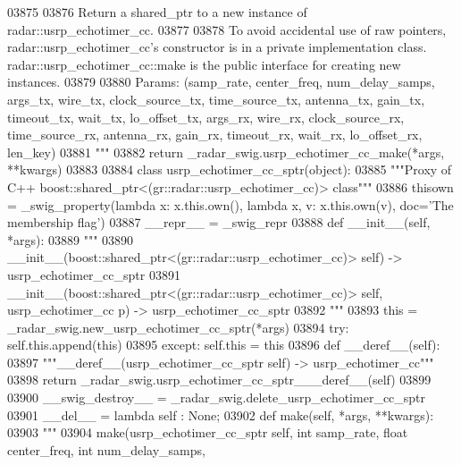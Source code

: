 \begin{DoxyCode}
{{{{{{{{{{{{{{03875 \textcolor{stringliteral}{}
03876 \textcolor{stringliteral}{    Return a shared\_ptr to a new instance of radar::usrp\_echotimer\_cc.}
03877 \textcolor{stringliteral}{}
03878 \textcolor{stringliteral}{    To avoid accidental use of raw pointers, radar::usrp\_echotimer\_cc's constructor is in a private
       implementation class. radar::usrp\_echotimer\_cc::make is the public interface for creating new instances.}
03879 \textcolor{stringliteral}{}
03880 \textcolor{stringliteral}{    Params: (samp\_rate, center\_freq, num\_delay\_samps, args\_tx, wire\_tx, clock\_source\_tx, time\_source\_tx,
       antenna\_tx, gain\_tx, timeout\_tx, wait\_tx, lo\_offset\_tx, args\_rx, wire\_rx, clock\_source\_rx, time\_source\_rx,
       antenna\_rx, gain\_rx, timeout\_rx, wait\_rx, lo\_offset\_rx, len\_key)}
03881 \textcolor{stringliteral}{    """}
03882   \textcolor{keywordflow}{return} \_radar\_swig.usrp\_echotimer\_cc\_make(*args, **kwargs)
03883 
03884 \textcolor{keyword}{class }usrp_echotimer_cc_sptr(object):
03885     \textcolor{stringliteral}{"""Proxy of C++ boost::shared\_ptr<(gr::radar::usrp\_echotimer\_cc)> class"""}
03886     thisown = _swig_property(\textcolor{keyword}{lambda} x: x.this.own(), \textcolor{keyword}{lambda} x, v: x.this.own(v), doc=\textcolor{stringliteral}{'The membership flag'})
03887     \_\_repr\_\_ = \_swig\_repr
03888     \textcolor{keyword}{def }__init__(self, *args): 
03889         \textcolor{stringliteral}{"""}
03890 \textcolor{stringliteral}{        \_\_init\_\_(boost::shared\_ptr<(gr::radar::usrp\_echotimer\_cc)> self) -> usrp\_echotimer\_cc\_sptr}
03891 \textcolor{stringliteral}{        \_\_init\_\_(boost::shared\_ptr<(gr::radar::usrp\_echotimer\_cc)> self, usrp\_echotimer\_cc p) ->
       usrp\_echotimer\_cc\_sptr}
03892 \textcolor{stringliteral}{        """}
03893         this = \_radar\_swig.new\_usrp\_echotimer\_cc\_sptr(*args)
03894         \textcolor{keywordflow}{try}: self.this.append(this)
03895         \textcolor{keywordflow}{except}: self.this = this
03896     \textcolor{keyword}{def }__deref__(self):
03897         \textcolor{stringliteral}{"""\_\_deref\_\_(usrp\_echotimer\_cc\_sptr self) -> usrp\_echotimer\_cc"""}
03898         \textcolor{keywordflow}{return} \_radar\_swig.usrp\_echotimer\_cc\_sptr\_\_\_deref\_\_(self)
03899 
03900     \_\_swig\_destroy\_\_ = \_radar\_swig.delete\_usrp\_echotimer\_cc\_sptr
03901     \_\_del\_\_ = \textcolor{keyword}{lambda} self : \textcolor{keywordtype}{None};
03902     \textcolor{keyword}{def }make(self, *args, **kwargs):
03903         \textcolor{stringliteral}{"""}
03904 \textcolor{stringliteral}{        make(usrp\_echotimer\_cc\_sptr self, int samp\_rate, float center\_freq, int num\_delay\_samps,
}}}}}}}}}}}}}}}
\end{DoxyCode}
